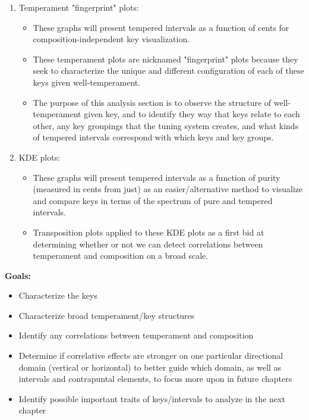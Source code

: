 \begin{enumerate}
\def\labelenumi{\arabic{enumi}.}
\tightlist
\item
  Temperament "fingerprint" plots:

  \begin{itemize}
  \tightlist
  \item
    These graphs will present tempered intervals as a function of cents
    for composition-independent key visualization.
  \item
    These temperament plots are nicknamed "fingerprint" plots because
    they seek to characterize the unique and different configuration of
    each of these keys given well-temperament.
  \item
    The purpose of this analysis section is to observe the structure of
    well-temperament given key, and to identify they way that keys
    relate to each other, any key groupings that the tuning system
    creates, and what kinds of tempered intervals correspond with which
    keys and key groups.
  \end{itemize}
\item
  KDE plots:

  \begin{itemize}
  \tightlist
  \item
    These graphs will present tempered intervals as a function of purity
    (measured in cents from just) as an easier/alternative method to
    visualize and compare keys in terms of the spectrum of pure and
    tempered intervals.
  \item
    Transposition plots applied to these KDE plots as a first bid at
    determining whether or not we can detect correlations between
    temperament and composition on a broad scale.
  \end{itemize}
\end{enumerate}

\textbf{Goals:}

\begin{itemize}
\tightlist
\item
  Characterize the keys
\item
  Characterize broad temperament/key structures
\item
  Identify any correlations between temperament and composition
\item
  Determine if correlative effects are stronger on one particular
  directional domain (vertical or horizontal) to better guide which
  domain, as well as intervals and contrapuntal elements, to focus more
  upon in future chapters
\item
  Identify possible important traits of keys/intervals to analyze in the
  next chapter
\end{itemize}

